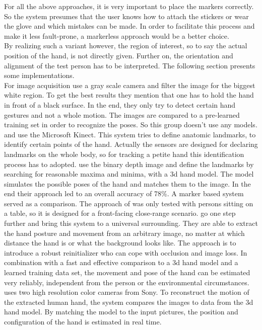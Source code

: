 For all the above approaches, it is very important to place the markers correctly. So the system presumes that the user knows how to attach the stickers or wear the glove and which mistakes can be made. In order to facilitate this process and make it less fault-prone, a markerless approach would be a better choice.\\
By realizing such a variant however, the region of interest, so to say the actual position of the hand, is not directly given. Further on, the orientation and alignment of the test person has to be interpreted. The following section presents some implementations.\\
For image acquisition \cite{ionescu2005dynamic} use a gray scale camera and filter the image for the biggest white region. To get the best results they mention that one has to hold the hand in front of a black surface. In the end, they only try to detect certain hand gestures and not a whole motion. The images are compared to a pre-learned training set in order to recognize the poses. So this group doesn't use any models.\\
\cite{metcalf2013markerless} and \cite{sharp2015accurate} use the Microsoft Kinect. This system tries to define anatomic landmarks, to identify certain points of the hand. Actually the sensors are designed for declaring landmarks on the whole body, so for tracking a petite hand this identification process has to adopted. \cite{metcalf2013markerless} use the binary depth image and define the landmarks by searching for reasonable maxima and minima, with a 3d hand model. The model simulates the possible poses of the hand and matches them to the image. In the end their approach led to an overall accuracy of 78\%. A marker based system served as a comparison. The approach of \cite{metcalf2013markerless} was only tested with persons sitting on a table, so it is designed for a front-facing close-range scenario.  \cite{sharp2015accurate} go one step further and bring this system to a universal surrounding. They are able to extract the hand posture and movement from an arbitrary image, no matter at which distance the hand is or what the background looks like. The approach is to introduce a robust reinitializer who can cope with occlusion and image loss. In combination with a fast and effective comparison to a 3d hand model and a learned training data set, the movement and pose of the hand can be estimated very reliably, independent from the person or the environmental circumstances.\\
\cite{john2006advanced} uses two high resolution color cameras from Sony. To reconstruct the motion of the extracted human hand, the system compares the images to data from the 3d hand model. By matching the model to the input pictures, the position and configuration of the hand is estimated in real time.\\
